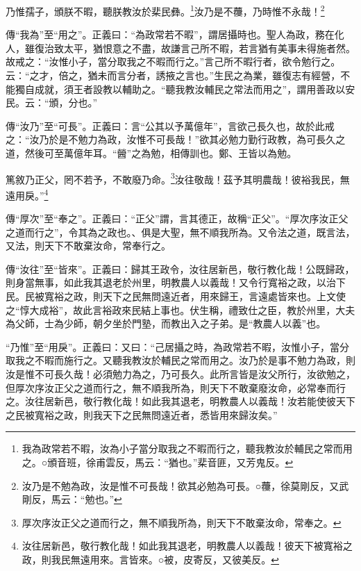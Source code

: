 乃惟孺子，頒朕不暇，聽朕教汝於棐民彝。\footnote{我為政常若不暇，汝為小子當分取我之不暇而行之，聽我教汝於輔民之常而用之。○頒音班，徐甫雲反，馬云：“猶也。”棐音匪，又芳鬼反。}汝乃是不蘉，乃時惟不永哉！\footnote{汝乃是不勉為政，汝是惟不可長哉！欲其必勉為可長。○蘉，徐莫剛反，又武剛反，馬云：“勉也。”}

{\noindent\zhuan{}\fzbyks 傳“我為”至“用之”。正義曰：“為政常若不暇”，謂居攝時也。聖人為政，務在化人，雖復治致太平，猶恨意之不盡，故謙言己所不暇，若言猶有美事未得施者然。故戒之：“汝惟小子，當分取我之不暇而行之。”言己所不暇行者，欲令勉行之。云：“之才，倍之，猶未而言分者，誘掖之言也。”生民之為業，雖復志有經營，不能獨自成就，須王者設教以輔助之。“聽我教汝輔民之常法而用之”，謂用善政以安民。云：“頒，分也。” \par}

{\noindent\zhuan{}\fzbyks 傳“汝乃”至“可長”。正義曰：言“公其以予萬億年”，言欲己長久也，故於此戒之：“汝乃於是不勉力為政，汝惟不可長哉！”欲其必勉力勤行政教，為可長久之道，然後可至萬億年耳。“醟”之為勉，相傳訓也。鄭、王皆以為勉。 \par}

篤敘乃正父，罔不若予，不敢廢乃命。\footnote{厚次序汝正父之道而行之，無不順我所為，則天下不敢棄汝命，常奉之。}汝往敬哉！茲予其明農哉！彼裕我民，無遠用戾。”\footnote{汝往居新邑，敬行教化哉！如此我其退老，明教農人以義哉！彼天下被寬裕之政，則我民無遠用來。言皆來。○被，皮寄反，又彼美反。}

{\noindent\zhuan{}\fzbyks 傳“厚次”至“奉之”。正義曰：“正父”謂，言其德正，故稱“正父”。“厚次序汝正父之道而行之”，令其為之政也。、俱是大聖，無不順我所為。又令法之道，既言法，又法，則天下不敢棄汝命，常奉行之。 \par}

{\noindent\zhuan{}\fzbyks 傳“汝往”至“皆來”。正義曰：歸其王政令，汝往居新邑，敬行教化哉！公既歸政，則身當無事，如此我其退老於州里，明教農人以義哉！又令行寬裕之政，以治下民。民被寬裕之政，則天下之民無問遠近者，用來歸王，言遠處皆來也。上文使之“惇大成裕”，故此言裕政來民結上事也。伏生稱，禮致仕之臣，教於州里，大夫為父師，士為少師，朝夕坐於門塾，而教出入之子弟。是“教農人以義”也。 \par}

{\noindent\shu{}\fzkt “乃惟”至“用戾”。正義曰：又曰：“己居攝之時，為政常若不暇，汝惟小子，當分取我之不暇而施行之。又聽我教汝於輔民之常而用之。汝乃於是事不勉力為政，則汝是惟不可長久哉！必須勉力為之，乃可長久。此所言皆是汝父所行，汝欲勉之，但厚次序汝正父之道而行之，無不順我所為，則天下不敢棄廢汝命，必常奉而行之。汝往居新邑，敬行教化哉！如此我其退老，明教農人以義哉！汝若能使彼天下之民被寬裕之政，則我天下之民無問遠近者，悉皆用來歸汝矣。” \par}

